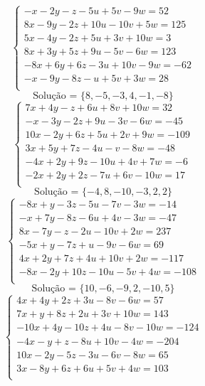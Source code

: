 \documentclass[12pt,oneside,a4paper]{article}
\begin{document}
\vspace{\baselineskip}
\begin{equation*}
\begin{cases}
-x-2y-z-5u+5v-9w=52 \\
8x-9y-2z+10u-10v+5w=125 \\
5x-4y-2z+5u+3v+10w=3 \\
8x+3y+5z+9u-5v-6w=123 \\
-8x+6y+6z-3u+10v-9w=-62 \\
-x-9y-8z-u+5v+3w=28 \\
\end{cases}
\end{equation*}
\begin{equation*}
\text{Solução = }\{8,-5,-3,4,-1,-8\}
\end{equation*}
\vspace{\baselineskip}
\begin{equation*}
\begin{cases}
7x+4y-z+6u+8v+10w=32 \\
-x-3y-2z+9u-3v-6w=-45 \\
10x-2y+6z+5u+2v+9w=-109 \\
3x+5y+7z-4u-v-8w=-48 \\
-4x+2y+9z-10u+4v+7w=-6 \\
-2x+2y+2z-7u+6v-10w=17 \\
\end{cases}
\end{equation*}
\begin{equation*}
\text{Solução = }\{-4,8,-10,-3,2,2\}
\end{equation*}
\vspace{\baselineskip}
\begin{equation*}
\begin{cases}
-8x+y-3z-5u-7v-3w=-14 \\
-x+7y-8z-6u+4v-3w=-47 \\
8x-7y-z-2u-10v+2w=237 \\
-5x+y-7z+u-9v-6w=69 \\
4x+2y+7z+4u+10v+2w=-117 \\
-8x-2y+10z-10u-5v+4w=-108 \\
\end{cases}
\end{equation*}
\begin{equation*}
\text{Solução = }\{10,-6,-9,2,-10,5\}
\end{equation*}
\vspace{\baselineskip}
\begin{equation*}
\begin{cases}
4x+4y+2z+3u-8v-6w=57 \\
7x+y+8z+2u+3v+10w=143 \\
-10x+4y-10z+4u-8v-10w=-124 \\
-4x-y+z-8u+10v-4w=-204 \\
10x-2y-5z-3u-6v-8w=65 \\
3x-8y+6z+6u+5v+4w=103 \\
\end{cases}
\end{equation*}
\end{document}
